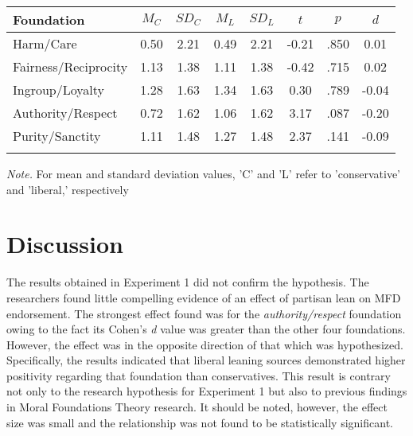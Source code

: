 \documentclass[english,,man]{apa6}
\begin{document}
\begin{table}[tbp]
\begin{center}
\begin{threeparttable}
\caption{\label{tab:exp1-table}}
\begin{tabular}{lccccccc}
\toprule
Foundation & $M_C$ & $SD_C$ & $M_L$ & $SD_L$ & $t$ & $p$ & $d$\\
\midrule
Harm/Care & 0.50 & 2.21 & 0.49 & 2.21 & -0.21 & .850 & 0.01\\
Fairness/Reciprocity & 1.13 & 1.38 & 1.11 & 1.38 & -0.42 & .715 & 0.02\\
Ingroup/Loyalty & 1.28 & 1.63 & 1.34 & 1.63 & 0.30 & .789 & -0.04\\
Authority/Respect & 0.72 & 1.62 & 1.06 & 1.62 & 3.17 & .087 & -0.20\\
Purity/Sanctity & 1.11 & 1.48 & 1.27 & 1.48 & 2.37 & .141 & -0.09\\
\bottomrule
\addlinespace
\end{tabular}
\begin{tablenotes}[para]
\normalsize{\textit{Note.} For mean and standard deviation values, 'C' and 'L' refer to 'conservative' and 'liberal,' respectively}
\end{tablenotes}
\end{threeparttable}
\end{center}
\end{table}

\hypertarget{discussion}{%
\section{Discussion}\label{discussion}}

The results obtained in Experiment 1 did not confirm the hypothesis. The researchers found little compelling evidence of an effect of partisan lean on MFD endorsement. The strongest effect found was for the \emph{authority/respect} foundation owing to the fact its Cohen's \emph{d} value was greater than the other four foundations. However, the effect was in the opposite direction of that which was hypothesized. Specifically, the results indicated that liberal leaning sources demonstrated higher positivity regarding that foundation than conservatives. This result is contrary not only to the research hypothesis for Experiment 1 but also to previous findings in Moral Foundations Theory research. It should be noted, however, the effect size was small and the relationship was not found to be statistically significant.
\end{document}
